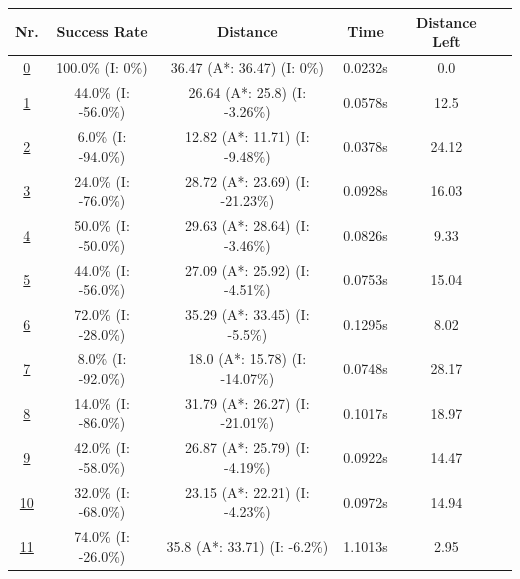 \begin{table}[h!] 
\footnotesize
\centering


\begin{tabular}{|cc|c|c|c|c|c|}
\hline
\multicolumn{2}{|c|}{\textbf{Nr.}} & \textbf{Success Rate} & \textbf{Distance} & \textbf{Time} & \textbf{Distance Left}\\
\hline
\hline
\multicolumn{2}{|c|}{\cellcolor{lightgray!20} \hyperref[tab: evalalgorithms]{0}} & 100.0\% (I: 0\%) & 36.47 (A*: 36.47) (I: 0\%) & 0.0232s & 0.0\\
\hline
\hline
\multicolumn{2}{|c|}{\cellcolor{red!40} \hyperref[tab: evalalgorithms]{1}} & 44.0\% (I: -56.0\%) & 26.64 (A*: 25.8) (I: -3.26\%) & 0.0578s & 12.5\\
\hline
\multicolumn{2}{|c|}{\cellcolor{red!20} \hyperref[tab: evalalgorithms]{2}} & 6.0\% (I: -94.0\%) & 12.82 (A*: 11.71) (I: -9.48\%) & 0.0378s & 24.12\\
\hline
\multicolumn{2}{|c|}{\cellcolor{red!20} \hyperref[tab: evalalgorithms]{3}} & 24.0\% (I: -76.0\%) & 28.72 (A*: 23.69) (I: -21.23\%) & 0.0928s & 16.03\\
\hline
\multicolumn{2}{|c|}{\cellcolor{red!20} \hyperref[tab: evalalgorithms]{4}} & 50.0\% (I: -50.0\%) & 29.63 (A*: 28.64) (I: -3.46\%) & 0.0826s & 9.33\\
\hline
\multicolumn{2}{|c|}{\cellcolor{red!20} \hyperref[tab: evalalgorithms]{5}} & 44.0\% (I: -56.0\%) & 27.09 (A*: 25.92) (I: -4.51\%) & 0.0753s & 15.04\\
\hline
\hline
\multicolumn{2}{|c|}{\cellcolor{blue!20} \hyperref[tab: evalalgorithms]{6}} & 72.0\% (I: -28.0\%) & 35.29 (A*: 33.45) (I: -5.5\%) & 0.1295s & 8.02\\
\hline
\multicolumn{2}{|c|}{\cellcolor{blue!40} \hyperref[tab: evalalgorithms]{7}} & 8.0\% (I: -92.0\%) & 18.0 (A*: 15.78) (I: -14.07\%) & 0.0748s & 28.17\\
\hline
\multicolumn{2}{|c|}{\cellcolor{blue!20} \hyperref[tab: evalalgorithms]{8}} & 14.0\% (I: -86.0\%) & 31.79 (A*: 26.27) (I: -21.01\%) & 0.1017s & 18.97\\
\hline
\multicolumn{2}{|c|}{\cellcolor{blue!20} \hyperref[tab: evalalgorithms]{9}} & 42.0\% (I: -58.0\%) & 26.87 (A*: 25.79) (I: -4.19\%) & 0.0922s & 14.47\\
\hline
\multicolumn{2}{|c|}{\cellcolor{blue!20} \hyperref[tab: evalalgorithms]{10}} & 32.0\% (I: -68.0\%) & 23.15 (A*: 22.21) (I: -4.23\%) & 0.0972s & 14.94\\
\hline
\hline
\multicolumn{2}{|c|}{\cellcolor{orange!40} \hyperref[tab: evalalgorithms]{11}} & 74.0\% (I: -26.0\%) & 35.8 (A*: 33.71) (I: -6.2\%) & 1.1013s & 2.95\\

\end{tabular}
\end{table}
